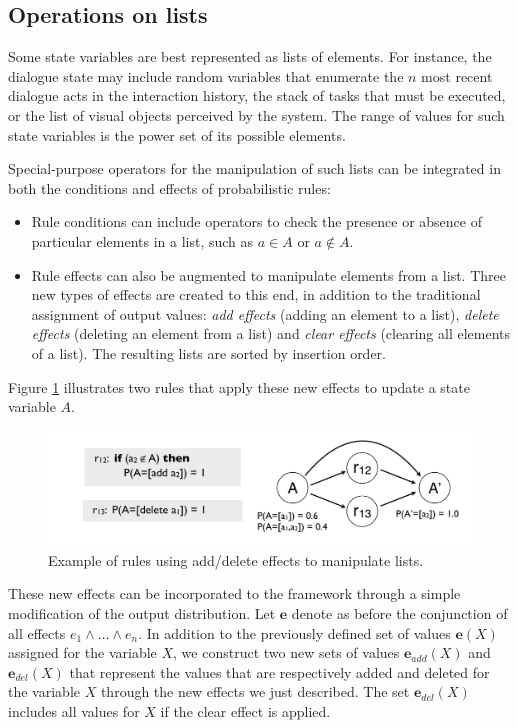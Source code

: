 \subsection{Operations on lists}

Some state variables are best represented as lists of elements. For instance, the dialogue state may include random variables that enumerate  the $n$ most recent dialogue acts in the interaction history, the stack of tasks that must be executed, or the list of visual objects perceived by the system.  The range of values for such state variables is the power set of its possible elements. 


Special-purpose operators for the manipulation of such lists can be integrated in both the conditions and effects of probabilistic rules: 
\begin{itemize}
\item Rule conditions can include operators to check the presence or absence of particular elements in a list, such as $a \in A$ or $a \notin A$. 
\item Rule effects can also be augmented to manipulate elements from a list.  Three new types of effects are created to this end, in addition to the traditional assignment of output values: \textit{add effects} (adding an element to a list), \textit{delete effects} (deleting an element from a list) and \textit{clear effects} (clearing all elements of a list). The resulting lists are sorted by insertion order. 
\end{itemize}

Figure \ref{fig:seteffects} illustrates two rules that apply these new effects to update a state variable $A$. 
 
\begin{figure}[h]
\centering
\includegraphics[scale=0.25]{imgs/seteffects.pdf}
\caption{Example of rules using add/delete effects to manipulate lists.}
\label{fig:seteffects}
\end{figure}

These new effects can be incorporated to the framework through a simple modification of the output distribution. Let $\mathbf{e}$ denote as before the conjunction of all effects $e_1 \land \dots \land e_n$. In addition to the previously defined set of values $\mathbf{e}(X)$ assigned for the variable $X$, we construct two new sets of values $\mathbf{e}_{add}(X)$ and $\mathbf{e}_{del}(X)$ that represent the values that are respectively added and deleted for the variable $X$ through the new effects we just described. The set $\mathbf{e}_{del}(X)$ includes all values for $X$ if the clear effect is applied. 

